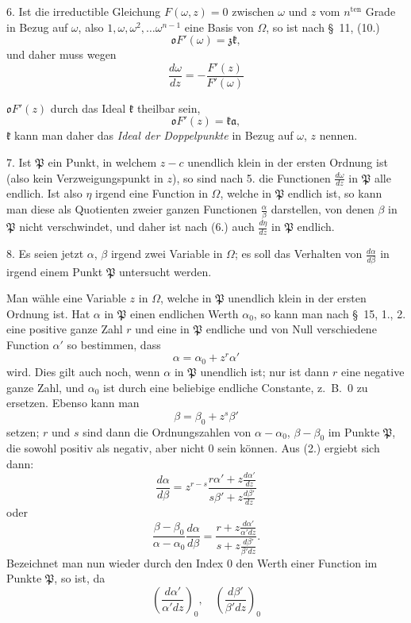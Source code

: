 \documentclass{article}
\begin{document}
6. Ist die irreductible Gleichung $F(\omega, z) = 0$ zwischen $\omega$ und $z$ vom $n^{\text{ten}}$ Grade in Bezug auf $\omega$, also $1, \omega, \omega^{2}, \ldots \omega^{n-1}$ eine Basis von $\Omega$, so ist nach §~11, (10.)
\[ \mathfrak{o}F'(\omega) = \mathfrak{z}\mathfrak{k}, \]
und daher muss wegen
\[ \frac{d\omega}{dz} = -\frac{F'(z)}{F'(\omega)} \]

$\mathfrak{o}F'(z)$ durch das Ideal $\mathfrak{k}$ theilbar sein,
\[ \mathfrak{o}F'(z) = \mathfrak{k}\mathfrak{a}, \]
$\mathfrak{k}$ kann man daher das \emph{Ideal der Doppelpunkte} in Bezug auf $\omega$, $z$ nennen.

7. Ist $\mathfrak{P}$ ein Punkt, in welchem $z-c$ unendlich klein in der ersten Ordnung ist (also kein Verzweigungspunkt in $z$), so sind nach 5. die Functionen $\frac{d\omega}{dz}$ in $\mathfrak{P}$ alle endlich. Ist also $\eta$ irgend eine Function in $\Omega$, welche in $\mathfrak{P}$ endlich ist, so kann man diese als Quotienten zweier ganzen Functionen $\frac{\alpha}{\beta}$ darstellen, von denen $\beta$ in $\mathfrak{P}$ nicht verschwindet, und daher ist nach (6.) auch $\frac{d\eta}{dz}$ in $\mathfrak{P}$ endlich.

8. Es seien jetzt $\alpha$, $\beta$ irgend zwei Variable in $\Omega$; es soll das Verhalten von $\frac{d\alpha}{d\beta}$ in irgend einem Punkt $\mathfrak{P}$ untersucht werden.

Man wähle eine Variable $z$ in $\Omega$, welche in $\mathfrak{P}$ unendlich klein in der ersten Ordnung ist. Hat $\alpha$ in $\mathfrak{P}$ einen endlichen Werth $\alpha_{0}$, so kann man nach §~15, 1., 2. eine positive ganze Zahl $r$ und eine in $\mathfrak{P}$ endliche und von Null verschiedene Function $\alpha'$ so bestimmen, dass
\[ \alpha = \alpha_{0} + z^{r}\alpha' \]
wird. Dies gilt auch noch, wenn $\alpha$ in $\mathfrak{P}$ unendlich ist; nur ist dann $r$ eine negative ganze Zahl, und $\alpha_{0}$ ist durch eine beliebige endliche Constante, z.\ B.\ 0 zu ersetzen. Ebenso kann man
\[ \beta = \beta_{0} + z^{s}\beta' \]
setzen; $r$ und $s$ sind dann die Ordnungszahlen von $\alpha-\alpha_{0}$, $\beta-\beta_{0}$ im Punkte $\mathfrak{P}$, die sowohl positiv als negativ, aber nicht 0 sein können. Aus (2.) ergiebt sich dann:
\[ \frac{d\alpha}{d\beta} = z^{r-s}\frac{r\alpha' + z\frac{d\alpha'}{dz}}{s\beta' + z\frac{d\beta'}{dz}} \]
oder
\[ \frac{\beta-\beta_{0}}{\alpha-\alpha_{0}}\frac{d\alpha}{d\beta} = \frac{r + z\frac{d\alpha'}{\alpha'dz}}{s + z\frac{d\beta'}{\beta'dz}}. \]
Bezeichnet man nun wieder durch den Index 0 den Werth einer Function im Punkte $\mathfrak{P}$, so ist, da
\[ \left(\frac{d\alpha'}{\alpha'dz}\right)_{0}, \quad \left(\frac{d\beta'}{\beta'dz}\right)_{0} \]
\end{document}
